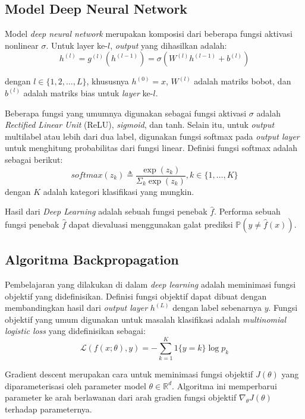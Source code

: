 \subsection{Model Deep Neural Network}
Model \emph{deep neural network} merupakan komposisi dari beberapa fungsi aktivasi nonlinear $\sigma$. Untuk layer ke-$l$, \emph{output} yang dihasilkan adalah:
\begin{equation}
h^{(l)} = g^{(l)}(h^{(l-1)}) = \sigma(W^{(l)}h^{(l-1)} + b^{(l)})
\end{equation}

dengan $l \in \{1,2,\dots,L\}$, khususnya $h^{(0)} = x$, $W^{(l)}$ adalah matriks bobot, dan $b^{(l)}$ adalah matriks bias untuk \emph{layer} ke-$l$.

Beberapa fungsi yang umumnya digunakan sebagai fungsi aktivasi $\sigma$ adalah \emph{Rectified Linear Unit} (ReLU), \emph{sigmoid}, dan tanh. Selain itu, untuk \emph{output} multilabel atau lebih dari dua label, digunakan fungsi softmax pada \emph{output layer} untuk menghitung probabilitas dari fungsi linear. Definisi fungsi softmax adalah sebagai berikut:
\begin{equation}
softmax(z_k) \triangleq \frac{\exp(z_k)}{\Sigma_k \exp(z_k)},
  k \in \{1,\dots,K\}
\end{equation}
dengan $K$ adalah kategori klasifikasi yang mungkin.

Hasil dari \emph{Deep Learning} adalah sebuah fungsi penebak $\hat{f}$. Performa sebuah fungsi penebak $\hat{f}$ dapat dievaluasi menggunakan galat prediksi $\mathbb{P}(y \neq \hat{f}(x))$.

\subsection{Algoritma Backpropagation}
Pembelajaran yang dilakukan di dalam \emph{deep learning} adalah meminimasi fungsi objektif yang didefinisikan. Definisi fungsi objektif dapat dibuat dengan membandingkan hasil dari \emph{output layer} $h^{(L)}$ dengan label sebenarnya $y$. Fungsi objektif yang umum digunakan untuk masalah klasifikasi adalah \emph{multinomial logistic loss} yang didefinisikan sebagai:
\begin{equation}
\mathcal{L}(f(x;\theta),y) = -\sum_{k=1}^K 1\{y=k\} \log p_k
\end{equation}

Gradient descent merupakan cara untuk meminimasi fungsi objektif $J(\theta)$ yang diparameterisasi oleh parameter model $\theta \in \mathbb{R}^d$. Algoritma ini memperbarui parameter ke arah berlawanan dari arah gradien fungsi objektif $\nabla_\theta J(\theta)$ terhadap parameternya.

